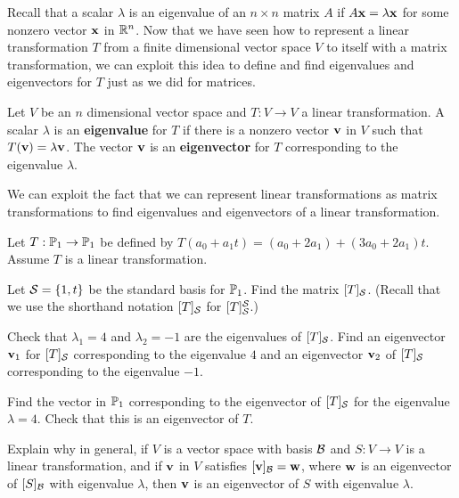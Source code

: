 \label{sec:eigen_trans_intro}


Recall that a scalar $\lambda$ is an eigenvalue of an $n \times n$ matrix $A$ if $A \mathbf{x} = \lambda \mathbf{x}$ for some nonzero vector $\mathbf{x}$ in $\mathbb{R}^n$. Now that we have seen how to represent a linear transformation $T$ from a finite dimensional vector space $V$ to itself with a matrix transformation, we can exploit this idea to define and find eigenvalues and eigenvectors for $T$ just as we did for matrices.

\begin{definition} Let $V$ be an $n$ dimensional vector space and $T : V \to V$ a linear transformation. A scalar $\lambda$ is an \textbf{eigenvalue} for $T$ if there is a nonzero vector $\mathbf{v}$ in $V$ such that $T(\mathbf{v}) = \lambda \mathbf{v}$. The vector $\mathbf{v}$ is an \textbf{eigenvector} for $T$ corresponding to the eigenvalue $\lambda$.
\end{definition}

We can exploit the fact that we can represent linear transformations as matrix transformations to find eigenvalues and eigenvectors of a linear transformation. 

\begin{pa} \label{pa:8_c} Let $T: \mathbb{P}_1 \to \mathbb{P}_1$ be defined by $T(a_0+a_1t) = (a_0+2a_1) + (3a_0+2a_1)t$. Assume $T$ is a linear transformation.
	\be
	\item Let $\mathcal{S} = \{1,t\}$ be the standard basis for $\mathbb{P}_1$. Find the matrix $[T]_{\mathcal{S}}$. (Recall that we use the shorthand notation $[T]_{\mathcal{S}}$ for $[T]_{\mathcal{S}}^{\mathcal{S}}$.)

	
	\item Check that $\lambda_1 = 4$ and $\lambda_2 = -1$ are the eigenvalues of $[T]_{\mathcal{S}}$. Find an eigenvector $\mathbf{v}_1$ for $[T]_{\mathcal{S}}$ corresponding to the eigenvalue $4$ and an eigenvector $\mathbf{v}_2$ of $[T]_{\mathcal{S}}$ corresponding to the eigenvalue $-1$.

	\item Find the vector in $\mathbb{P}_1$ corresponding to the eigenvector of $[T]_{\mathcal{S}}$ for the eigenvalue $\lambda=4$. Check that this is an eigenvector of $T$.
	

	\item Explain why in general, if $V$ is a vector space with basis $\mathcal{B}$ and $S: V \to V$ is a linear transformation, and if $\mathbf{v}$ in $V$ satisfies $[\mathbf{v}]_{\mathcal{B}}=\mathbf{w}$, where $\mathbf{w}$ is an eigenvector of $[S]_{\mathcal{B}}$ with eigenvalue $\lambda$, then $\mathbf{v}$ is an eigenvector of $S$ with eigenvalue $\lambda$.

	
	\ee

\end{pa}

